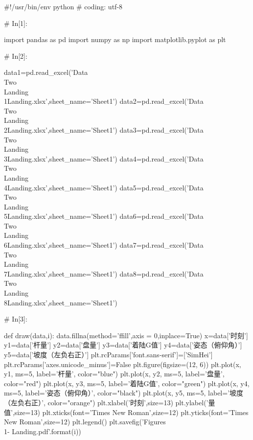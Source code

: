 \documentclass{MathorCupModeling}
\begin{document}
\begin{python}
#!/usr/bin/env python
# coding: utf-8

# In[1]:


import pandas as pd
import numpy as np
import matplotlib.pyplot as plt


# In[2]:


data1=pd.read_excel('Data\\Two\\Landing\\1Landing.xlsx',sheet_name='Sheet1')
data2=pd.read_excel('Data\\Two\\Landing\\2Landing.xlsx',sheet_name='Sheet1')
data3=pd.read_excel('Data\\Two\\Landing\\3Landing.xlsx',sheet_name='Sheet1')
data4=pd.read_excel('Data\\Two\\Landing\\4Landing.xlsx',sheet_name='Sheet1')
data5=pd.read_excel('Data\\Two\\Landing\\5Landing.xlsx',sheet_name='Sheet1')
data6=pd.read_excel('Data\\Two\\Landing\\6Landing.xlsx',sheet_name='Sheet1')
data7=pd.read_excel('Data\\Two\\Landing\\7Landing.xlsx',sheet_name='Sheet1')
data8=pd.read_excel('Data\\Two\\Landing\\8Landing.xlsx',sheet_name='Sheet1')


# In[3]:


def draw(data,i):
    data.fillna(method='ffill',axis = 0,inplace=True)
    x=data['时刻']
    y1=data['杆量']
    y2=data['盘量']
    y3=data['着陆G值']
    y4=data['姿态（俯仰角）']
    y5=data['坡度（左负右正）']
    plt.rcParams['font.sans-serif']=['SimHei']
    plt.rcParams['axes.unicode_minus']=False
    plt.figure(figsize=(12, 6))
    plt.plot(x, y1, ms=5, label='杆量', color="blue")
    plt.plot(x, y2, ms=5, label='盘量', color="red")
    plt.plot(x, y3, ms=5, label='着陆G值', color="green")
    plt.plot(x, y4, ms=5, label='姿态（俯仰角）', color="black")
    plt.plot(x, y5, ms=5, label='坡度（左负右正）', color="orange")
    plt.xlabel('时刻',size=13)
    plt.ylabel('量值',size=13)
    plt.xticks(font='Times New Roman',size=12)
    plt.yticks(font='Times New Roman',size=12)
    plt.legend()
    plt.savefig('Figures\\1-{} Landing.pdf'.format(i))



\end{python}
\end{document}
